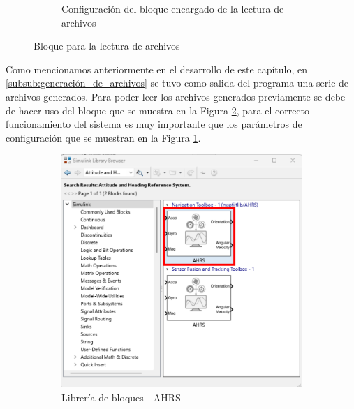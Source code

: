 \begin{figure}[htbp]
\begin{subfigure}[b]{0.45\textwidth}
        \caption{Configuración del bloque encargado de la lectura de archivos}
        \label{fig:config_from_file_IMU}
    \end{subfigure}
    \caption{Bloque para la lectura de archivos}
    \label{fig:read_from_file}
\end{figure}

Como mencionamos anteriormente en el desarrollo de este capítulo, en \ref{subsub:generación_de_archivos} se tuvo como salida del programa una serie de archivos generados. Para poder leer los archivos generados previamente se debe de hacer uso del bloque que se muestra en la Figura \ref{fig:read_from_file}, para el correcto funcionamiento del sistema es muy importante que los parámetros de configuración que se muestran en la Figura \ref{fig:config_from_file_IMU}.

\begin{figure}[htbp]
    \centering
    \begin{subfigure}[b]{0.35\textwidth}
        \centering
        \includegraphics[width=\textwidth]{fig/Capitulo5/Caso_de_estudio_IMU/Generador_de_salidas/libreira_de_bloques_sensor_AHRS.pdf}
        \caption{Librería de bloques - AHRS}
        \label{fig:lib_bloques_AHRS}
    \end{subfigure}
    \hfill
    \begin{subfigure}[b]{0.45\textwidth}

\end{subfigure}
\end{figure}
